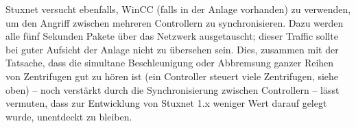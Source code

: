 \documentclass{article}
\begin{document}
Stuxnet versucht ebenfalls, WinCC (falls in der Anlage vorhanden) zu verwenden, um den Angriff zwischen mehreren Controllern zu synchronisieren.
Dazu werden alle fünf Sekunden Pakete über das Netzwerk ausgetauscht; dieser Traffic sollte bei guter Aufsicht der Anlage nicht zu übersehen sein.
Dies, zusammen mit der Tatsache, dass die simultane Beschleunigung oder Abbremsung ganzer Reihen von Zentrifugen gut zu hören ist
(ein Controller steuert viele Zentrifugen, siehe oben) – noch verstärkt durch die Synchronisierung zwischen Controllern –
lässt vermuten, dass zur Entwicklung von Stuxnet 1.x weniger Wert darauf gelegt wurde, unentdeckt zu bleiben.
\end{document}
